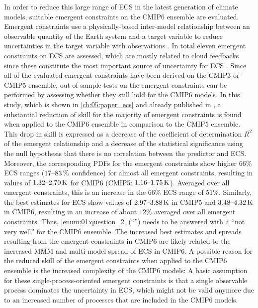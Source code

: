 In order to reduce this large range of \ac{ECS} in the latest generation of
climate  models, suitable emergent constraints on the \acs{CMIP}6 ensemble are
evaluated. Emergent constraints use a physically-based inter-model relationship
between an observable quantity of the Earth system and a target variable to
reduce uncertainties in the target variable with observations
\autocite{Allen2002}. In total eleven emergent constraints on \ac{ECS} are
assessed, which are mostly related to cloud feedbacks since these constitute
the most important source of uncertainty for \ac{ECS} \autocite{Boucher2013,
  Flato2013}. Since all of the evaluated emergent constraints have been derived
on the \acs{CMIP}3 or \acs{CMIP}5 ensemble, out-of-sample tests on the emergent
constraints can be performed by assessing whether they still hold for the
\acs{CMIP}6 models. In this study, which is shown in \cref{ch:05:paper_ecs} and
already published in \textcite{Schlund2020a}, a substantial reduction of skill
for the majority of emergent constraints is found when applied to the
\acs{CMIP}6 ensemble in comparison to the \acs{CMIP}5 ensemble. This drop in
skill is expressed as a decrease of the coefficient of determination $R^2$ of
the emergent relationship and a decrease of the statistical significance using
the null hypothesis that there is no correlation between the predictor and
\ac{ECS}. Moreover, the corresponding \acp{PDF} for the emergent constraints
show higher $66 \unit{\%}$ \ac{ECS} ranges ($\rangeunit{17}{83}{\%}$
confidence) for almost all emergent constraints, resulting in values of
$\rangeunit{1.32}{2.70}{K}$ for \acs{CMIP}6 (\acs{CMIP}5:
$\rangeunit{1.16}{1.75}{K}$). Averaged over all emergent constraints, this is
an increase in the $66 \unit{\%}$ \ac{ECS} range of $51 \unit{\%}$. Similarly,
the best estimates for \ac{ECS} show values of $\rangeunit{2.97}{3.88}{K}$ in
\acs{CMIP}5 and $\rangeunit{3.48}{4.32}{K}$ in \acs{CMIP}6, resulting in an
increase of about $12 \unit{\%}$ averaged over all emergent constraints. Thus,
\cref{enum:01:question_2} (\enquote{\emph{\KeyScienceQuestionTwo{}}}) needs to
be answered with a \enquote{not very well} for the \acs{CMIP}6 ensemble. The
increased best estimates and spreads resulting from the emergent constraints in
\acs{CMIP}6 are likely related to the increased \ac{MMM} and multi-model spread
of \ac{ECS} in \acs{CMIP}6. A possible reason for the reduced skill of the
emergent constraints when applied to the \acs{CMIP}6 ensemble is the increased
complexity of the \acs{CMIP}6 models: A basic assumption for these
single-process-oriented emergent constraints is that a single observable
process dominates the uncertainty in \ac{ECS}, which might not be valid anymore
due to an increased number of processes that are included in the \acs{CMIP}6
models.

